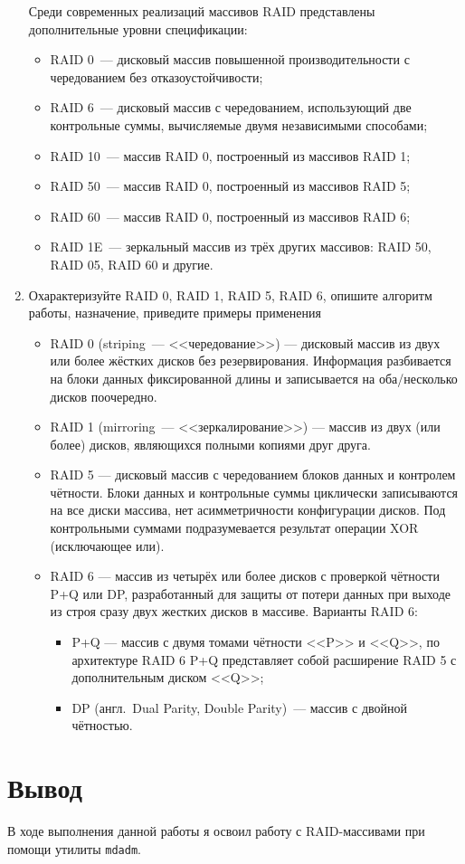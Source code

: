 \documentclass[12pt]{article}
\begin{document}
\begin{enumerate}
\begin{itemize}
	      \end{itemize}
	      Среди современных реализаций массивов RAID представлены дополнительные уровни спецификации:
	      \begin{itemize}
		      \item RAID 0 — дисковый массив повышенной производительности с чередованием без отказоустойчивости;
		      \item RAID 6 — дисковый массив с чередованием, использующий две контрольные суммы, вычисляемые двумя независимыми способами;
		      \item RAID 10 — массив RAID 0, построенный из массивов RAID 1;
		      \item RAID 50 — массив RAID 0, построенный из массивов RAID 5;
		      \item RAID 60 — массив RAID 0, построенный из массивов RAID 6;
		      \item RAID 1E — зеркальный массив из трёх других массивов: RAID 50, RAID 05, RAID 60 и другие.
	      \end{itemize}
	\item Охарактеризуйте RAID 0, RAID 1, RAID 5, RAID 6, опишите алгоритм работы,
	      назначение, приведите примеры применения \\
	      \begin{itemize}
		      \item RAID 0 (striping — <<чередование>>)
		            --- дисковый массив из двух или более жёстких дисков без резервирования.
		            Информация разбивается на блоки данных фиксированной длины и записывается
		            на оба/несколько дисков поочередно.
		      \item RAID 1 (mirroring --- <<зеркалирование>>)
		            --- массив из двух (или более) дисков, являющихся полными копиями друг друга.
		      \item RAID 5
		            --- дисковый массив с чередованием блоков данных и контролем чётности.
		            Блоки данных и контрольные суммы циклически записываются на все диски массива,
		            нет асимметричности конфигурации дисков.
		            Под контрольными суммами подразумевается результат операции XOR (исключающее или).
		      \item RAID 6
		            --- массив из четырёх или более дисков с проверкой чётности P+Q или DP,
		            разработанный для защиты от потери данных при выходе из строя
		            сразу двух жестких дисков в массиве.
		            Варианты RAID 6:
		            \begin{itemize}
			            \item P+Q
			                  --- массив с двумя томами чётности <<P>> и <<Q>>,
			                  по архитектуре RAID 6 P+Q представляет собой расширение RAID 5
			                  с дополнительным диском <<Q>>;
			            \item DP (англ. Dual Parity, Double Parity) — массив с двойной чётностью.
		            \end{itemize}
	      \end{itemize}
\end{enumerate}

\section{Вывод}
В ходе выполнения данной работы я освоил работу с RAID-массивами при помощи утилиты \texttt{mdadm}.
\end{document}
